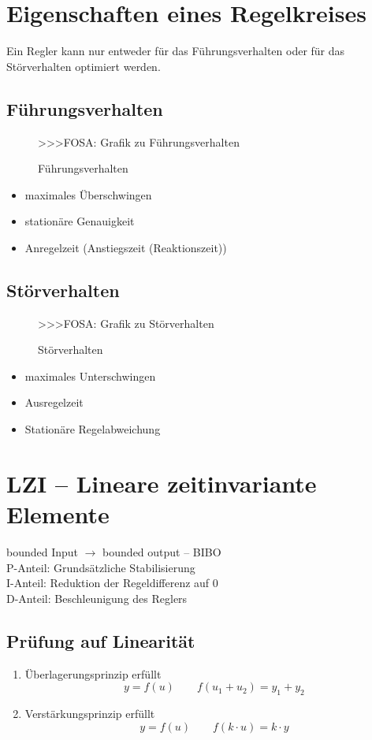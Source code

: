 \section{Eigenschaften eines Regelkreises}
Ein Regler kann nur entweder für das Führungsverhalten oder für das 
Störverhalten optimiert werden. 

\subsection{Führungsverhalten}
\begin{figure}[h!]
    \centering
    >>>FOSA: Grafik zu Führungsverhalten
    \caption{Führungsverhalten}
    \label{fig:fhr}
\end{figure}
\begin{itemize}
  \item maximales Überschwingen
  \item stationäre Genauigkeit
  \item Anregelzeit (Anstiegszeit (Reaktionszeit))
\end{itemize}

\subsection{Störverhalten}
\begin{figure}[h!]
    \centering
    >>>FOSA: Grafik zu Störverhalten
    \caption{Störverhalten}
    \label{fig:str}
\end{figure}
\begin{itemize}
  \item maximales Unterschwingen
  \item Ausregelzeit
  \item Stationäre Regelabweichung
\end{itemize}

\section{LZI -- Lineare zeitinvariante Elemente}
bounded Input $\rightarrow$ bounded output -- BIBO\\
P-Anteil: Grundsätzliche Stabilisierung \\
I-Anteil: Reduktion der Regeldifferenz auf 0 \\
D-Anteil: Beschleunigung des Reglers

\subsection{Prüfung auf Linearität}
\begin{enumerate}
  \item Überlagerungsprinzip erfüllt 
        \[ y = f(u) \qquad f(u_1 + u_2) = y_1 + y_2 \]
  \item Verstärkungsprinzip erfüllt
        \[ y = f(u) \qquad f(k \cdot u) = k \cdot y \]
\end{enumerate}

